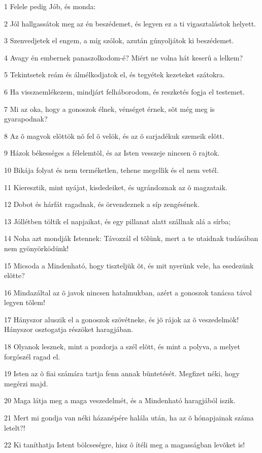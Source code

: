 \par 1 Felele pedig Jób, és monda:
\par 2 Jól hallgassátok meg az én beszédemet, és legyen ez a ti vigasztalástok helyett.
\par 3 Szenvedjetek el engem, a míg szólok, azután gúnyoljátok ki beszédemet.
\par 4 Avagy én embernek panaszolkodom-é? Miért ne volna hát keserû a lelkem?
\par 5 Tekintsetek reám és álmélkodjatok el, és tegyétek kezeteket szátokra.
\par 6 Ha visszaemlékezem, mindjárt felháborodom, és reszketés fogja el testemet.
\par 7 Mi az oka, hogy a gonoszok élnek, vénséget érnek, sõt még meg is gyarapodnak?
\par 8 Az õ magvok elõttök nõ fel õ velök, és az õ sarjadékuk szemeik elõtt.
\par 9 Házok békességes a félelemtõl, és az Isten vesszeje nincsen õ rajtok.
\par 10 Bikája folyat és nem terméketlen, tehene megellik és el nem vetél.
\par 11 Kieresztik, mint nyájat, kisdedeiket, és ugrándoznak az õ magzataik.
\par 12 Dobot és hárfát ragadnak, és örvendeznek a síp zengésének.
\par 13 Jóllétben töltik el napjaikat, és egy pillanat alatt szállnak alá a sírba;
\par 14 Noha azt mondják Istennek: Távozzál el tõlünk, mert a te utaidnak tudásában nem gyönyörködünk!
\par 15 Micsoda a Mindenható, hogy tiszteljük õt, és mit nyerünk vele, ha esedezünk elõtte?
\par 16 Mindazáltal az õ javok nincsen hatalmukban, azért a gonoszok tanácsa távol legyen tõlem!
\par 17 Hányszor aluszik el a gonoszok szövétneke, és jõ rájok az õ veszedelmök! Hányszor osztogatja részöket haragjában.
\par 18 Olyanok lesznek, mint a pozdorja a szél elõtt, és mint a polyva, a melyet forgószél ragad el.
\par 19 Isten az õ fiai számára tartja fenn annak büntetését. Megfizet néki, hogy megérzi majd.
\par 20 Maga látja meg a maga veszedelmét, és a Mindenható haragjából iszik.
\par 21 Mert mi gondja van néki házanépére halála után, ha az õ hónapjainak száma letelt?!
\par 22 Ki taníthatja Istent bölcseségre, hisz õ ítéli meg a magasságban levõket is!
